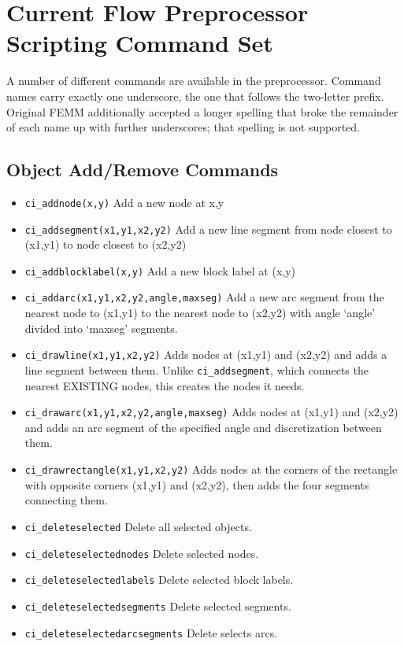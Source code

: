 \section{Current Flow Preprocessor Scripting Command Set}

A number of different commands are available in the preprocessor.
Command names carry exactly one underscore, the one that follows the
two-letter prefix.  Original FEMM additionally accepted a longer
spelling that broke the remainder of each name up with further
underscores; that spelling is not supported.

\subsection{Object Add/Remove Commands}
\begin{itemize}
\item {\tt ci\_addnode(x,y)} Add a new node at x,y

\item {\tt ci\_addsegment(x1,y1,x2,y2)} Add a new line segment from node closest to
(x1,y1) to node closest to (x2,y2)

\item {\tt ci\_addblocklabel(x,y)} Add a new block label at (x,y)

\item {\tt ci\_addarc(x1,y1,x2,y2,angle,maxseg)} Add a new arc segment from the
nearest node to (x1,y1) to the nearest node to (x2,y2) with angle `angle'
divided into `maxseg' segments.

\item{\tt ci\_drawline(x1,y1,x2,y2)} Adds nodes at (x1,y1) and (x2,y2) and adds a line segment between them. Unlike {\tt ci\_addsegment}, which connects the nearest EXISTING nodes, this creates the nodes it needs.

\item{\tt ci\_drawarc(x1,y1,x2,y2,angle,maxseg)} Adds nodes at (x1,y1) and (x2,y2) and adds an arc segment of the specified angle and discretization between them.

\item{\tt ci\_drawrectangle(x1,y1,x2,y2)} Adds nodes at the corners of the rectangle with opposite corners (x1,y1) and (x2,y2), then adds the four segments connecting them.

\item {\tt ci\_deleteselected} Delete all selected objects.

\item {\tt ci\_deleteselectednodes} Delete selected nodes.

\item {\tt ci\_deleteselectedlabels} Delete selected block labels.

\item {\tt ci\_deleteselectedsegments} Delete selected segments.

\item {\tt ci\_deleteselectedarcsegments} Delete selects arcs.
\end{itemize}


